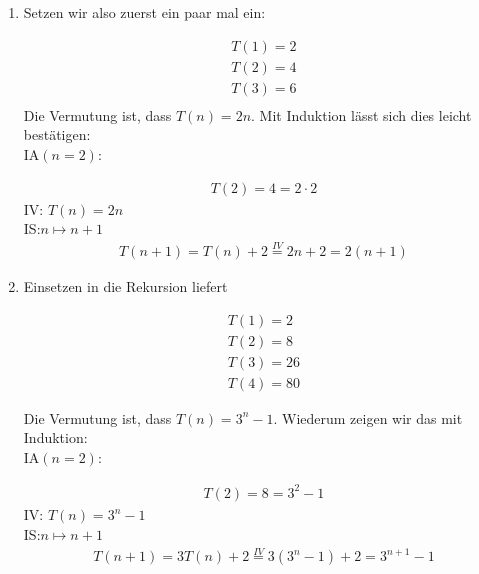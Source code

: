 \begin{solution}
\phantom{}
\begin{enumerate}[label = \alph*)]
  \item Setzen wir also zuerst ein paar mal ein:

  \begin{align*}
    T(1) = 2 \\
    T(2) = 4 \\
    T(3) = 6 \\
  \end{align*}
 Die Vermutung ist, dass $T(n) = 2n$. Mit Induktion lässt sich dies leicht bestätigen: \\
  IA$(n=2)$:

  \begin{align*}
    T(2) = 4 = 2 \cdot 2
  \end{align*}
  IV: $T(n) = 2n$ \\

  IS:$n \mapsto n+1$
  \begin{align*}
    T(n+1)
    =
    T(n) + 2
    \stackrel{IV}{=}
    2n + 2
    =
    2(n+1)
  \end{align*}

  \item Einsetzen in die Rekursion liefert

  \begin{align*}
    T(1) = 2 \\
    T(2) = 8 \\
    T(3) = 26 \\
    T(4) = 80
  \end{align*}

  Die Vermutung ist, dass $T(n) = 3^n - 1$. Wiederum zeigen wir das mit Induktion: \\
  IA$(n=2)$:

  \begin{align*}
    T(2) = 8 = 3^2 - 1
  \end{align*}
  IV: $T(n) = 3^n - 1$ \\

  IS:$n \mapsto n+1$
  \begin{align*}
    T(n+1)
    =
    3T(n) + 2
    \stackrel{IV}{=}
    3(3^n - 1) + 2
    =
    3^{n+1} - 1
  \end{align*}
  \end{enumerate}

\end{solution}

